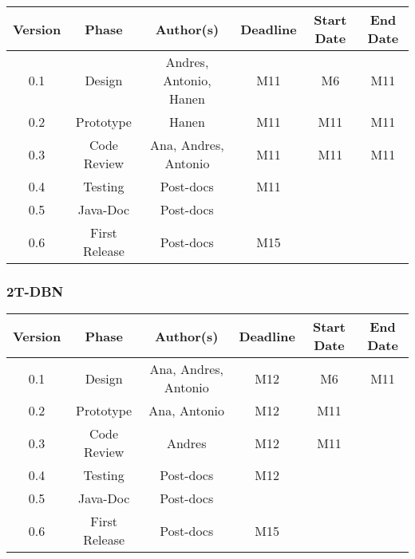 \begin{table}[H]
\begin{tabular}{cccccc}
\hline
\textbf{Version} & \textbf{Phase} & \textbf{Author(s)} & \textbf{Deadline} & \textbf{Start Date} & \textbf{End Date}\\
\hline
0.1 & Design & Andres, Antonio, Hanen &  M11  & M6 & M11\\
\hline 
0.2 & Prototype & Hanen &  M11 & M11 & M11\\
\hline 
0.3 & Code Review & Ana, Andres, Antonio & M11  & M11  & M11\\
\hline 
0.4 & Testing & Post-docs & M11 &  & \\
\hline 
0.5 & Java-Doc  & Post-docs &  &  & \\
\hline 
0.6 & First Release & Post-docs & M15 &  & \\
\hline
\end{tabular}
\end{table}

\subsubsection*{2T-DBN}

\begin{table}[H]
\begin{tabular}{cccccc}
\hline
\textbf{Version} & \textbf{Phase} & \textbf{Author(s)} & \textbf{Deadline} & \textbf{Start Date} & \textbf{End Date}\\
\hline
0.1 & Design & Ana, Andres, Antonio &  M12 & M6 & M11\\
\hline 
0.2 & Prototype & Ana, Antonio &  M12  & M11 & \\
\hline 
0.3 & Code Review & Andres &  M12  & M11 & \\
\hline 
0.4 & Testing & Post-docs & M12 &  & \\
\hline 
0.5 & Java-Doc  & Post-docs &  &  & \\
\hline 
0.6 & First Release & Post-docs & M15 &  & \\
\hline
\end{tabular}
\end{table}

